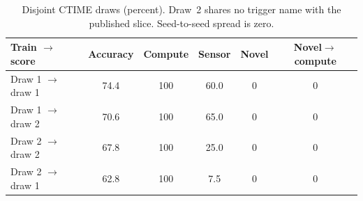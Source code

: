 \begin{table}[t]
\caption{Disjoint CTIME draws (percent). Draw~2 shares no trigger name with the published slice. Seed-to-seed spread is zero.}
\label{tab:draw}
\centering
\small
\begin{tabular}{lccccc}
\toprule
Train $\to$ score & Accuracy & Compute & Sensor & Novel & Novel$\to$compute \\
\midrule
Draw 1 $\to$ draw 1 & 74.4 & 100 & 60.0 & 0 & 0 \\
Draw 1 $\to$ draw 2 & 70.6 & 100 & 65.0 & 0 & 0 \\
Draw 2 $\to$ draw 2 & 67.8 & 100 & 25.0 & 0 & 0 \\
Draw 2 $\to$ draw 1 & 62.8 & 100 & 7.5 & 0 & 0 \\
\bottomrule
\end{tabular}
\end{table}
